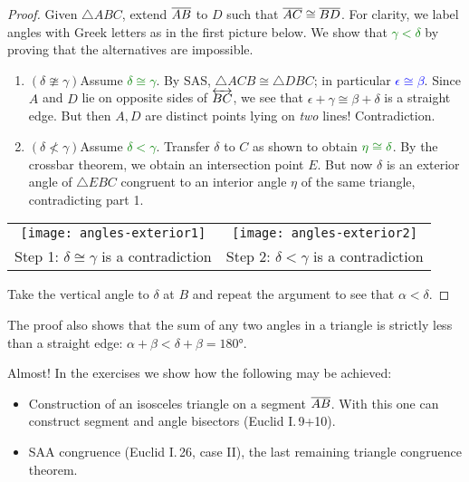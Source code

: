 \begin{proof}
	Given $\triangle ABC$, extend $\overline{AB}$ to $D$ such that \textcolor{blue}{$\overline{AC}\cong\overline{BD}$}. For clarity, we label angles with Greek letters as in the first picture below. We show that \textcolor{Green}{$\gamma<\delta$} by proving that the alternatives are impossible.	
	\begin{enumerate}\itemsep0pt
		\item $(\delta\ncong\gamma)$\lstsp Assume \textcolor{Green}{$\delta\cong\gamma$}. By SAS, $\triangle ACB\cong\triangle DBC$; in particular \textcolor{blue}{$\epsilon\cong\beta$}. Since $A$ and $D$ lie on opposite sides of $\overleftrightarrow{BC}$, we see that $\epsilon+\gamma\cong \beta+\delta$ is a straight edge. But then $A,D$ are distinct points lying on \emph{two} lines! Contradiction.
		\item $(\delta\not<\gamma)$\lstsp Assume \textcolor{Green}{$\delta<\gamma$}. Transfer $\delta$ to $C$ as shown to obtain $\textcolor{Green}{\eta\cong\delta}$. By the crossbar theorem, we obtain an intersection point $E$. But now $\delta$ is an exterior angle of $\triangle EBC$ congruent to an interior angle $\eta$ of the same triangle, contradicting part 1.
	\end{enumerate}
	\begin{center}
		\begin{tabular}{c@{\qquad}c}
			\texttt{[image: angles-exterior1]}
			&
			\texttt{[image: angles-exterior2]}
			\\
			Step 1: $\delta\cong\gamma$ is a contradiction
			&
			Step 2: $\delta<\gamma$ is a contradiction
		\end{tabular}
	\end{center}
	Take the vertical angle to $\delta$ at $B$ and repeat the argument to see that $\alpha<\delta$.
\end{proof}

The proof also shows that the sum of any two angles in a triangle is strictly less than a straight edge: $\alpha+\beta<\delta+\beta =\ang{180}$.

\goodbreak


Almost! In the exercises we show how the following may be achieved:
\begin{itemize}
  \item Construction of an isosceles triangle on a segment $\overline{AB}$. With this one can construct segment and angle bisectors (Euclid I.\,9+10).
  \item SAA congruence (Euclid I.\,26, case II), the last remaining triangle congruence theorem.
\end{itemize}

